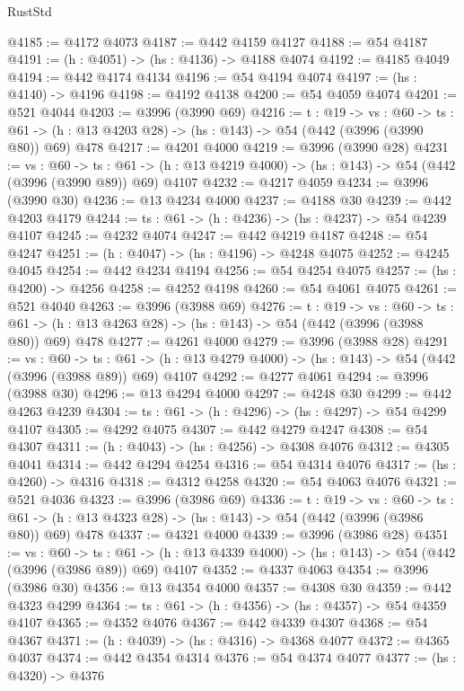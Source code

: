 \begin{lexlean}{RustStd}
\begin{coremodule}
@4185 := @4172 @4073
@4187 := @442 @4159 @4127
@4188 := @54 @4187
@4191 := (h : @4051) -> (hs : @4136) -> @4188 @4074
@4192 := @4185 @4049
@4194 := @442 @4174 @4134
@4196 := @54 @4194 @4074
@4197 := (hs : @4140) -> @4196
@4198 := @4192 @4138
@4200 := @54 @4059 @4074
@4201 := @521 @4044
@4203 := @3996 (@3990 @69)
@4216 := {t : @19} ->
  {vs : @60} ->
  {ts : @61} -> (h : @13 @4203 @28) -> (hs : @143) -> @54 (@442 (@3996 (@3990 @80)) @69) @478
@4217 := @4201 @4000
@4219 := @3996 (@3990 @28)
@4231 := {vs : @60} ->
  {ts : @61} -> (h : @13 @4219 @4000) -> (hs : @143) -> @54 (@442 (@3996 (@3990 @89)) @69) @4107
@4232 := @4217 @4059
@4234 := @3996 (@3990 @30)
@4236 := @13 @4234 @4000
@4237 := @4188 @30
@4239 := @442 @4203 @4179
@4244 := {ts : @61} -> (h : @4236) -> (hs : @4237) -> @54 @4239 @4107
@4245 := @4232 @4074
@4247 := @442 @4219 @4187
@4248 := @54 @4247
@4251 := (h : @4047) -> (hs : @4196) -> @4248 @4075
@4252 := @4245 @4045
@4254 := @442 @4234 @4194
@4256 := @54 @4254 @4075
@4257 := (hs : @4200) -> @4256
@4258 := @4252 @4198
@4260 := @54 @4061 @4075
@4261 := @521 @4040
@4263 := @3996 (@3988 @69)
@4276 := {t : @19} ->
  {vs : @60} ->
  {ts : @61} -> (h : @13 @4263 @28) -> (hs : @143) -> @54 (@442 (@3996 (@3988 @80)) @69) @478
@4277 := @4261 @4000
@4279 := @3996 (@3988 @28)
@4291 := {vs : @60} ->
  {ts : @61} -> (h : @13 @4279 @4000) -> (hs : @143) -> @54 (@442 (@3996 (@3988 @89)) @69) @4107
@4292 := @4277 @4061
@4294 := @3996 (@3988 @30)
@4296 := @13 @4294 @4000
@4297 := @4248 @30
@4299 := @442 @4263 @4239
@4304 := {ts : @61} -> (h : @4296) -> (hs : @4297) -> @54 @4299 @4107
@4305 := @4292 @4075
@4307 := @442 @4279 @4247
@4308 := @54 @4307
@4311 := (h : @4043) -> (hs : @4256) -> @4308 @4076
@4312 := @4305 @4041
@4314 := @442 @4294 @4254
@4316 := @54 @4314 @4076
@4317 := (hs : @4260) -> @4316
@4318 := @4312 @4258
@4320 := @54 @4063 @4076
@4321 := @521 @4036
@4323 := @3996 (@3986 @69)
@4336 := {t : @19} ->
  {vs : @60} ->
  {ts : @61} -> (h : @13 @4323 @28) -> (hs : @143) -> @54 (@442 (@3996 (@3986 @80)) @69) @478
@4337 := @4321 @4000
@4339 := @3996 (@3986 @28)
@4351 := {vs : @60} ->
  {ts : @61} -> (h : @13 @4339 @4000) -> (hs : @143) -> @54 (@442 (@3996 (@3986 @89)) @69) @4107
@4352 := @4337 @4063
@4354 := @3996 (@3986 @30)
@4356 := @13 @4354 @4000
@4357 := @4308 @30
@4359 := @442 @4323 @4299
@4364 := {ts : @61} -> (h : @4356) -> (hs : @4357) -> @54 @4359 @4107
@4365 := @4352 @4076
@4367 := @442 @4339 @4307
@4368 := @54 @4367
@4371 := (h : @4039) -> (hs : @4316) -> @4368 @4077
@4372 := @4365 @4037
@4374 := @442 @4354 @4314
@4376 := @54 @4374 @4077
@4377 := (hs : @4320) -> @4376

\end{coremodule}
\end{lexlean}

